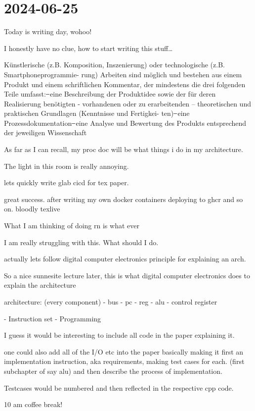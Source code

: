 \section{2024-06-25} %
\label{sec:2024-06-25}
Today is writing day, wohoo!

I honestly have no clue, how to start writing this stuff\dots

Künstlerische (z.B. Komposition, Inszenierung) oder technologische (z.B. Smartphoneprogrammie-
rung) Arbeiten sind möglich und bestehen aus einem Produkt und einem schriftlichen Kommentar,
der mindestens die drei folgenden Teile umfasst:
̶ eine Beschreibung der Produktidee sowie der für deren Realisierung benötigten - vorhandenen
oder zu erarbeitenden – theoretischen und praktischen Grundlagen (Kenntnisse und Fertigkei-
ten)
̶ eine Prozessdokumentation
̶ eine Analyse und Bewertung des Produkts entsprechend der jeweiligen Wissenschaft

As far as I can recall, my proc doc will be what things i do in my architecture. 

The light in this room is really annoying.

lets quickly write glab cicd for tex paper.

great success. after writing my own docker containers deploying to ghcr and so on. bloodly texlive



What I am thinking of doing rn is what ever

I am really struggling with this. What should I do. 

actually lets follow digital computer electronics principle for explaining an arch. 


So a nice sunnesite lecture later, this is what digital computer electronics does to explain the architecture

architecture:
(every component)
- bus
- pc
- reg
- alu
- control register 

- Instruction set
- Programming

I guess it would be interesting to include all code in the paper explaining it. 

one could also add all of the I/O etc into the paper
basically making it first an implementation instruction, aka requirements, making test cases for each. (first subchapter of say alu) and then describe the process of implementation. 

Testcases would be numbered and then reflected in the respective cpp code. 

10 am coffee break!


